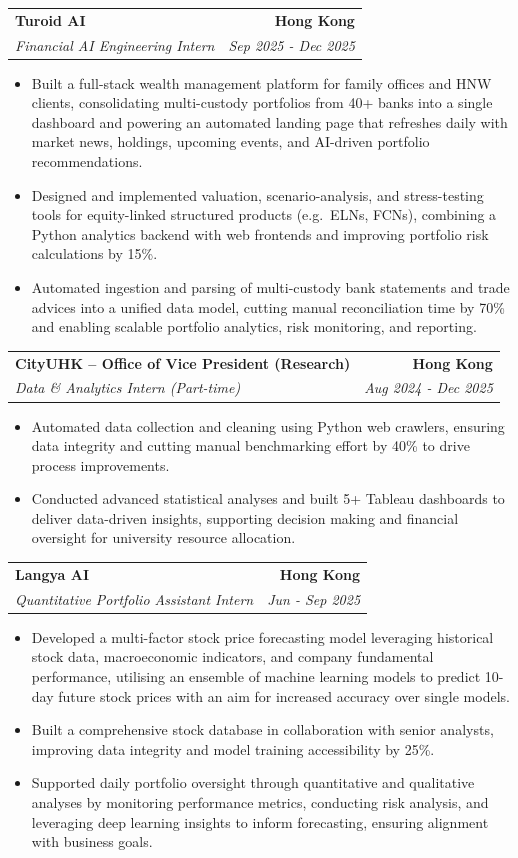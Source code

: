 \documentclass[9pt,a4paper]{article}
\makeatletter
\newcommand{\resumeSubheading}[4]{%
  \vspace{0.6em}%
  \begin{tabular*}{\textwidth}{l@{\extracolsep{\fill}}r}
    \textbf{#1} & \textbf{#2} \\
    \textit{\small #3} & \textit{\small #4} \\
  \end{tabular*}\vspace{0.32em}}
\makeatother
\begin{document}
\resumeSubheading{Turoid AI}{Hong Kong}{Financial AI Engineering Intern}{Sep 2025 - Dec 2025}
\begin{itemize}
  \item Built a full-stack wealth management platform for family offices and HNW clients, consolidating multi-custody portfolios from 40+ banks into a single dashboard and powering an automated landing page that refreshes daily with market news, holdings, upcoming events, and AI-driven portfolio recommendations.
  \item Designed and implemented valuation, scenario-analysis, and stress-testing tools for equity-linked structured products (e.g.\ ELNs, FCNs), combining a Python analytics backend with web frontends and improving portfolio risk calculations by 15\%.
  \item Automated ingestion and parsing of multi-custody bank statements and trade advices into a unified data model, cutting manual reconciliation time by 70\% and enabling scalable portfolio analytics, risk monitoring, and reporting.
\end{itemize}

\resumeSubheading{CityUHK -- Office of Vice President (Research)}{Hong Kong}{Data \& Analytics Intern (Part-time)}{Aug 2024 - Dec 2025}
\begin{itemize}
  \item Automated data collection and cleaning using Python web crawlers, ensuring data integrity and cutting manual benchmarking effort by 40\% to drive process improvements.
  \item Conducted advanced statistical analyses and built 5+ Tableau dashboards to deliver data-driven insights, supporting decision making and financial oversight for university resource allocation.
\end{itemize}

\resumeSubheading{Langya AI}{Hong Kong}{Quantitative Portfolio Assistant Intern}{Jun - Sep 2025}
\begin{itemize}
  \item Developed a multi-factor stock price forecasting model leveraging historical stock data, macroeconomic indicators, and company fundamental performance, utilising an ensemble of machine learning models to predict 10-day future stock prices with an aim for increased accuracy over single models.
  \item Built a comprehensive stock database in collaboration with senior analysts, improving data integrity and model training accessibility by 25\%.
  \item Supported daily portfolio oversight through quantitative and qualitative analyses by monitoring performance metrics, conducting risk analysis, and leveraging deep learning insights to inform forecasting, ensuring alignment with business goals.
\end{itemize}
\end{document}
